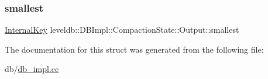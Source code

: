 \mbox{\label{structleveldb_1_1_d_b_impl_1_1_compaction_state_1_1_output_a88ada857d0cf32ae8e76d7baf4e80c69}} 
\subsubsection{\texorpdfstring{smallest}{smallest}}
{\footnotesize\ttfamily \mbox{\hyperlink{classleveldb_1_1_internal_key}{Internal\+Key}} leveldb\+::\+D\+B\+Impl\+::\+Compaction\+State\+::\+Output\+::smallest}



The documentation for this struct was generated from the following file\+:\begin{DoxyCompactItemize}
\item 
db/\mbox{\hyperlink{db__impl_8cc}{db\+\_\+impl.\+cc}}\end{DoxyCompactItemize}

